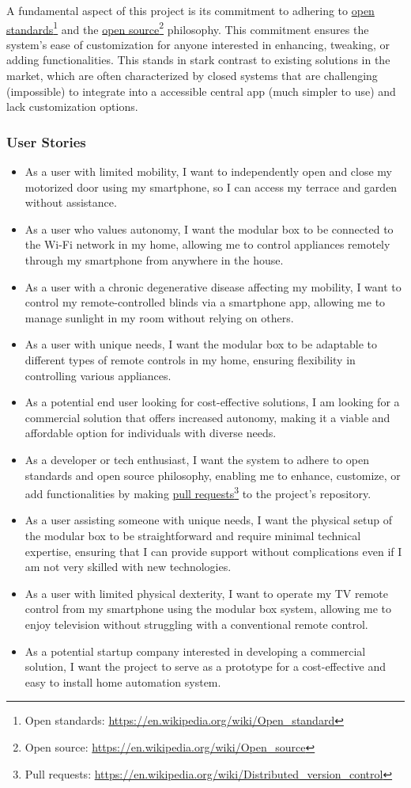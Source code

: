 \documentclass[12pt, a4paper, openany]{article}
\newcommand{\footlink}[2]{\href{#2}{#1}\footnote{{\MakeUppercase #1}: \url{#2}}}
\begin{document}
A fundamental aspect of this project is its commitment to adhering to \footlink{open standards}{https://en.wikipedia.org/wiki/Open_standard} and the \footlink{open source}{https://en.wikipedia.org/wiki/Open_source} philosophy.
This commitment ensures the system's ease of customization for anyone interested in enhancing, tweaking, or adding functionalities.
This stands in stark contrast to existing solutions in the market, which are often characterized by closed systems that are challenging (impossible) to integrate into a accessible central app (much simpler to use) and lack customization options.

\subsubsection*{User Stories}

\begin{itemize}
    \item As a user with limited mobility, I want to independently open and close my motorized door using my smartphone, so I can access my terrace and garden without assistance.
    \item As a user who values autonomy, I want the modular box to be connected to the Wi-Fi network in my home, allowing me to control appliances remotely through my smartphone from anywhere in the house.
    \item As a user with a chronic degenerative disease affecting my mobility, I want to control my remote-controlled blinds via a smartphone app, allowing me to manage sunlight in my room without relying on others.
    \item As a user with unique needs, I want the modular box to be adaptable to different types of remote controls in my home, ensuring flexibility in controlling various appliances.
    \item As a potential end user looking for cost-effective solutions, I am looking for a commercial solution that offers increased autonomy, making it a viable and affordable option for individuals with diverse needs.
    \item As a developer or tech enthusiast, I want the system to adhere to open standards and open source philosophy, enabling me to enhance, customize, or add functionalities by making \footlink{pull requests}{https://en.wikipedia.org/wiki/Distributed_version_control} to the project's repository.
    \item As a user assisting someone with unique needs, I want the physical setup of the modular box to be straightforward and require minimal technical expertise, ensuring that I can provide support without complications even if I am not very skilled with new technologies.
    \item As a user with limited physical dexterity, I want to operate my TV remote control from my smartphone using the modular box system, allowing me to enjoy television without struggling with a conventional remote control.
    \item As a potential startup company interested in developing a commercial solution, I want the project to serve as a prototype for a cost-effective and easy to install home automation system.
\end{itemize}
\end{document}
